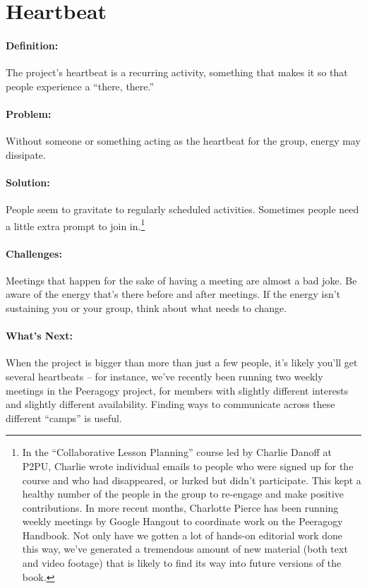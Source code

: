\section{Heartbeat}

\paragraph{Definition:} The project's heartbeat is a recurring activity,
something that makes it so that people experience a ``there, there.''

\paragraph{Problem:} Without someone or something acting as the heartbeat
for the group, energy may dissipate.

\paragraph{Solution:} People seem to gravitate to regularly scheduled
activities. Sometimes people need a little extra prompt to join in.\footnote{In the ``Collaborative Lesson Planning'' course led
by Charlie Danoff at P2PU, Charlie wrote individual emails to people who
were signed up for the course and who had disappeared, or lurked but
didn't participate. This kept a healthy number of the people in the
group to re-engage and make positive contributions. In more recent
months, Charlotte Pierce has been running weekly meetings by Google
Hangout to coordinate work on the Peeragogy Handbook. Not only have we
gotten a lot of hands-on editorial work done this way, we've generated a
tremendous amount of new material (both text and video footage) that is
likely to find its way into future versions of the book.}

\paragraph{Challenges:} Meetings that happen for the sake of having a
meeting are almost a bad joke. Be aware of the energy that's there
before and after meetings. If the energy isn't sustaining you or your
group, think about what needs to change.

\paragraph{What's Next:} When the project is bigger than more than just a
few people, it's likely you'll get several heartbeats -- for instance,
we've recently been running two weekly meetings in the Peeragogy
project, for members with slightly different interests and slightly
different availability. Finding ways to communicate across these
different ``camps'' is useful.
